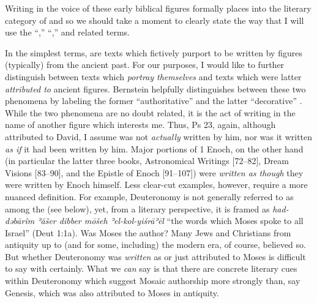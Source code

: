 Writing in the voice of these early biblical figures formally places
\ga into the literary category of \psy
and so we should take a moment to clearly state the way that I will use
the ``\psy,'' ``\psa,'' and related
terms.\autocites[The topic of \psy has received a large
amount of very sophisticated attention in recent years. See
especially][]{mroczek2016}{tigchelaar_tigchelaar2014}{reed_towsend-moulie2011}{reed_jts2009}{reed_ditomasso-turcescu2008}{najman_hilhorst-puech2007}{najman2003}

In the simplest terms, \psa are texts which fictively
purport to be written by figures (typically) from the ancient past. For
our purposes, I would like to further distinguish between texts which
\emph{portray themselves} and texts which were latter \emph{attributed
to} ancient figures. Bernstein helpfully distinguishes between these two
phenomena by labeling the former ``authoritative'' \psy
and the latter ``decorative'' \psy.\autocite[He also
identifies a third form, ``convenient'' \psy which is
located somewhere between the two. I do not find this category as
helpful.][3--7]{bernstein_chazon-etal1999} While the two phenomena are
no doubt related, it is the act of writing in the name of another figure
which interests me. Thus, Ps 23, again, although attributed to David, I
assume was not \emph{actually} written by him, nor was it written
\emph{as if} it had been written by him. Major portions of 1 Enoch, on
the other hand (in particular the latter three books, Astronomical
Writings {[}72--82{]}, Dream Visions {[}83--90{]}, and the Epistle of
Enoch {[}91--107{]}) were \emph{written as though} they were written by
Enoch himself. Less clear-cut examples, however, require a more nuanced
definition. For example, Deuteronomy is not generally referred to as
among the \psa (see below), yet, from a literary
perspective, it is framed as \emph{had-dəbārîm ʾăšer dibber mōšeh
ʾel-kol-yiśrāʾēl} ``the words which Moses spoke to all Israel'' (Deut
1:1a). Was Moses the author? Many Jews and Christians from antiquity up
to (and for some, including) the modern era, of course, believed so. But
whether Deuteronomy was \emph{written} as \psa or just
attributed to Moses is difficult to say with certainly. What we
\emph{can} say is that there are concrete literary cues within
Deuteronomy which suggest Mosaic authorship more strongly than, say
Genesis, which was also attributed to Moses in antiquity.

